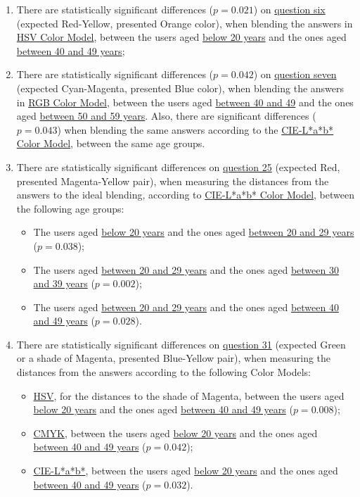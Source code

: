 \begin{enumerate}
  \item There are statistically significant differences ($p = 0.021$) on \ul{question six} (expected Red-Yellow, presented Orange color), when blending the answers in \ul{HSV Color Model}, between the users aged \ul{below 20 years} and the ones aged \ul{between 40 and 49 years};
  \item There are statistically significant differences ($p = 0.042$) on \ul{question seven} (expected Cyan-Magenta, presented Blue color), when blending the answers in \ul{RGB Color Model}, between the users aged \ul{between 40 and 49} and the ones aged \ul{between 50 and 59 years}.
  Also, there are significant differences ($p = 0.043$) when blending the same answers according to the \ul{CIE-L*a*b* Color Model}, between the same age groups.
  \item There are statistically significant differences on \ul{question 25} (expected Red, presented Magenta-Yellow pair), when measuring the distances from the answers to the ideal blending, according to \ul{CIE-L*a*b* Color Model}, between the following age groups:
    \begin{itemize}
      \item The users aged \ul{below 20 years} and the ones aged \ul{between 20 and 29 years} ($p = 0.038$);
      \item The users aged \ul{between 20 and 29 years} and the ones aged \ul{between 30 and 39 years} ($p = 0.002$);
      \item The users aged \ul{between 20 and 29 years} and the ones aged \ul{between 40 and 49 years} ($p = 0.028$).
    \end{itemize}
  \item There are statistically significant differences on \ul{question 31} (expected Green or a shade of Magenta, presented Blue-Yellow pair), when measuring the distances from the answers according to the following Color Models:
    \begin{itemize}
      \item \ul{HSV}, for the distances to the shade of Magenta, between the users aged \ul{below 20 years} and the ones aged \ul{between 40 and 49 years} ($p = 0.008$);
      \item \ul{CMYK}, between the users aged \ul{below 20 years} and the ones aged \ul{between 40 and 49 years} ($p = 0.042$);
      \item \ul{CIE-L*a*b*}, between the users aged \ul{below 20 years} and the ones aged \ul{between 40 and 49 years} ($p = 0.032$).
    \end{itemize}
\end{enumerate} \par
